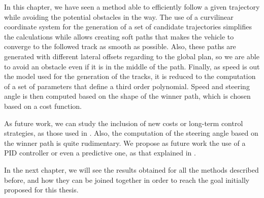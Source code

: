 In this chapter, we have seen a method able to efficiently follow a given trajectory while avoiding the potential obstacles in the way. The use of a curvilinear coordinate system for the generation of a set of candidate trajectories simplifies the calculations while allows creating soft paths that makes the vehicle to converge to the followed track as smooth as possible. Also, these paths are generated with different lateral offsets regarding to the global plan, so we are able to avoid an obstacle even if it is in the middle of the path. Finally, as speed is out the model used for the generation of the tracks, it is reduced to the computation of a set of parameters that define a third order polynomial. Speed and steering angle is then computed based on the shape of the winner path, which is chosen based on a cost function.

As future work, we can study the inclusion of new costs or long-term control strategies, as those used in \cite{werling2010optimal}. Also, the computation of the steering angle based on the winner path is quite rudimentary. We propose as future work the use of a \ac{PID} controller or even a predictive one, as that explained in .

In the next chapter, we will see the results obtained for all the methods described before, and how they can be joined together in order to reach the goal initially proposed for this thesis.


